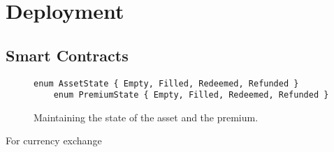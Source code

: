 \section{Deployment}
\label{sec:deployment}

\subsection{Smart Contracts}


\begin{figure}
    \begin{lstlisting}[language=Solidity, basicstyle=\tiny]
    enum AssetState { Empty, Filled, Redeemed, Refunded }
    enum PremiumState { Empty, Filled, Redeemed, Refunded }
    \end{lstlisting}
    \label{code:state}
    \caption{Maintaining the state of the asset and the premium.}
\end{figure}

For currency exchange

